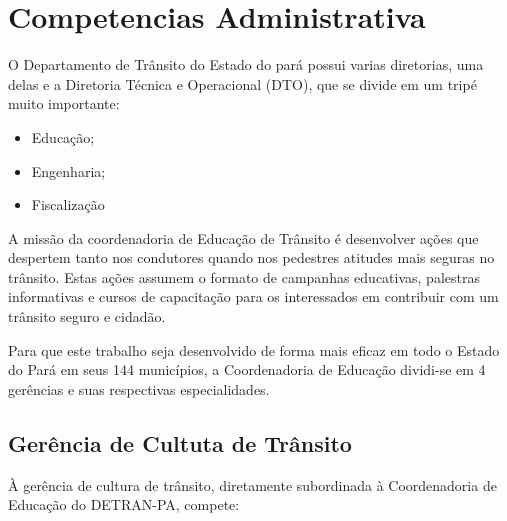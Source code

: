 \documentclass[a4paper]{article}
\begin{document}
\section{Competencias Administrativa}

O Departamento de Trânsito do Estado do pará possui varias diretorias, uma delas e a Diretoria Técnica e Operacional (DTO), que se divide em um tripé muito importante:

\begin{itemize}
    \item Educação;
    \item Engenharia;
    \item Fiscalização
\end{itemize}


A missão da coordenadoria de Educação de Trânsito é desenvolver ações que despertem tanto nos condutores quando nos pedestres atitudes mais seguras no trânsito. Estas ações assumem o formato de campanhas educativas, palestras informativas e cursos de capacitação para os interessados em contribuir com um trânsito seguro e cidadão.\vskip0.3cm

Para que este trabalho seja desenvolvido de forma mais eficaz em todo o Estado do Pará em seus 144 municípios, a Coordenadoria de Educação dividi-se em 4 gerências e suas respectivas especialidades.\vskip0.3cm 


\subsection{Gerência de Cultuta de Trânsito}
À gerência de cultura de trânsito, diretamente subordinada à Coordenadoria de Educação do DETRAN-PA, compete:
\vskip0.3cm
\end{document}

